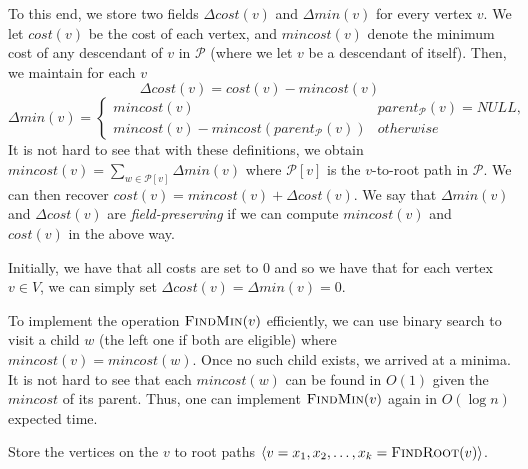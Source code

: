 To this end, we store two fields $\Delta cost(v)$ and $\Delta min(v)$ for every vertex $v$. We let $cost(v)$ be the cost of each vertex, and $mincost(v)$ denote the minimum cost of any descendant of $v$ in $\mathcal{P}$ (where we let $v$ be a descendant of itself). Then, we maintain for each $v$
\[
    \Delta cost(v) = cost(v) - mincost(v)
\]
\[
    \Delta min(v) = \begin{cases}
    mincost(v) & parent_{\mathcal{P}}(v) = NULL, \\
    mincost(v) - mincost(parent_{\mathcal{P}}(v)) & otherwise\end{cases}
\]
It is not hard to see that with these definitions, we obtain $mincost(v) = \sum_{w \in \mathcal{P}[v]} \Delta min(v)$ where $\mathcal{P}[v]$ is the $v$-to-root path in $\mathcal{P}$. We can then recover $cost(v) = mincost(v) + \Delta cost(v)$. We say that $\Delta min(v)$ and $\Delta cost(v)$ are \emph{field-preserving} if we can compute $mincost(v)$ and $cost(v)$ in the above way. 

Initially, we have that all costs are set to $0$ and so we have that for each vertex $v \in V$, we can simply set $\Delta cost(v) = \Delta min(v) = 0$. 

To implement the operation $\textsc{FindMin}(v)$ efficiently, we can use binary search to visit a child $w$ (the left one if both are eligible) where $mincost(v) = mincost(w)$. Once no such child exists, we arrived at a minima. It is not hard to see that each $mincost(w)$ can be found in $O(1)$ given the $mincost$ of its parent. Thus, one can implement $\textsc{FindMin}(v)$ again in $O(\log n)$ expected time. 

\begin{algorithm}
  \SetAlgoLined
  \DontPrintSemicolon
  Store the vertices on the $v$ to root paths $\langle v = x_1, x_2, \ldots, x_k = \textsc{FindRoot}(v)\rangle$.\\
  
  \caption{$\textsc{AddCost}(v, \Delta)$}
\end{algorithm}

